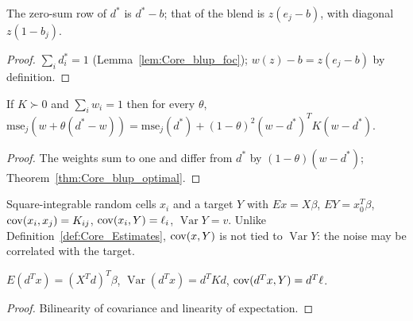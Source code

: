 \begin{corollary}\label{cor:Core_gauge_rows}
  \leanok
  The zero-sum row of $d^*$ is $d^* - b$; that of the blend is $z(e_j - b)$, with diagonal $z(1 - b_j)$.
\end{corollary}
\begin{proof}
  \leanok
  $\sum_i d^*_i = 1$ (Lemma~\ref{lem:Core_blup_foc}); $w(z) - b = z(e_j - b)$ by definition.
\end{proof}

\begin{theorem}\label{thm:Core_shrink_blup}
  \leanok
  If $K \succ 0$ and $\sum_i w_i = 1$ then for every $\theta$,
  $\mathrm{mse}_j(w + \theta(d^* - w)) = \mathrm{mse}_j(d^*) + (1-\theta)^2(w - d^*)^TK(w - d^*)$.
\end{theorem}
\begin{proof}
  \leanok
  The weights sum to one and differ from $d^*$ by $(1-\theta)(w - d^*)$;
  Theorem~\ref{thm:Core_blup_optimal}.
\end{proof}

\begin{definition}\label{def:Blup_Target}
  \leanok
  Square-integrable random cells $x_i$ and a target $Y$ with $E x = X\beta$,
  $E Y = x_0^T\beta$, $\operatorname{cov}(x_i, x_j) = K_{ij}$, $\operatorname{cov}(x_i, Y) = \ell_i$, $\operatorname{Var} Y = v$. Unlike
  Definition~\ref{def:Core_Estimates}, $\operatorname{cov}(x, Y)$ is not tied to $\operatorname{Var} Y$: the noise may be
  correlated with the target.
\end{definition}

\begin{lemma}\label{lem:Blup_moments_lin}
  \leanok
  $E(d^Tx) = (X^Td)^T\beta$, $\operatorname{Var}(d^Tx) = d^TKd$, $\operatorname{cov}(d^Tx, Y) = d^T\ell$.
\end{lemma}
\begin{proof}
  \leanok
  Bilinearity of covariance and linearity of expectation.
\end{proof}


